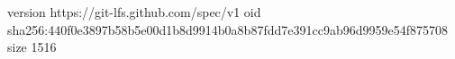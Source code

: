 version https://git-lfs.github.com/spec/v1
oid sha256:440f0e3897b58b5e00d1b8d9914b0a8b87fdd7e391cc9ab96d9959e54f875708
size 1516
